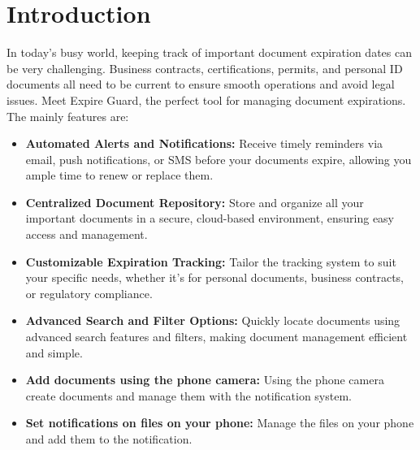 \section{Introduction}
In today's busy world, keeping track of important document expiration dates can be very challenging. Business contracts, certifications, permits, and personal ID documents all need to be current to ensure smooth operations and avoid legal issues. Meet Expire Guard, the perfect tool for managing document expirations.\\
The mainly features are:
\begin{itemize}
	\item \textbf{Automated Alerts and Notifications:} Receive timely reminders via email, push notifications, or SMS before your documents expire, allowing you ample time to renew or replace them.
	\item \textbf{Centralized Document Repository:} Store and organize all your important documents in a secure, cloud-based environment, ensuring easy access and management.
	\item \textbf{Customizable Expiration Tracking:} Tailor the tracking system to suit your specific needs, whether it’s for personal documents, business contracts, or regulatory compliance.
	\item \textbf{Advanced Search and Filter Options:} Quickly locate documents using advanced search features and filters, making document management efficient and simple.
	\item \textbf{Add documents using the phone camera: } Using the phone camera create documents and manage them with the notification system.
	\item \textbf{Set notifications on files on your phone: } Manage the files on your phone and add them to the notification.
\end{itemize}